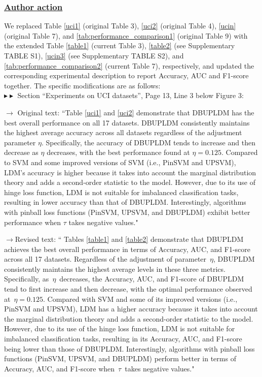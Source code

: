 \documentclass[journal,12pn, onecolumn]{IEEEtran}
\begin{document}
{{{{{\color{black}
\subsubsection*{\textbf{\underline{Author action }}}
We replaced Table \ref{uci1} (original Table 3), \ref{uci2} (original Table 4), \ref{ucin} (original Table 7), and \ref{tab:performance_comparison1} (original Table 9) with the extended Table \ref{table1} (current Table 3), \ref{table2} (see Supplementary TABLE S1), \ref{ucin3} (see Supplementary TABLE S2), and  \ref{tab:performance_comparison2} (current Table 7), respectively, and updated the corresponding experimental description to report Accuracy, AUC and F1-score together. The specific modifications are as follows: \\

$\blacktriangleright\blacktriangleright$ Section ``Experiments on UCI datasets'', Page 13,  Line 3 below Figure 3:\\
\par
{\color{black} $\longrightarrow$  Original  text: ``Table \ref{uci1} and \ref{uci2} demonstrate that DBUPLDM has the best overall performance on all 17 datasets. DBUPLDM consistently maintains the highest average accuracy across all datasets regardless of the adjustment parameter $\eta$. Specifically, the accuracy of DBUPLDM tends to increase and then decrease as $\eta$ decreases, with the best performance found at $\eta = 0.125$. Compared to SVM and some improved versions of SVM (i.e., PinSVM and UPSVM), LDM's accuracy is higher because it takes into account the marginal distribution theory and adds a second-order statistic to the model. However, due to its use of hinge loss function, LDM is not suitable for imbalanced classification tasks, resulting in lower accuracy than that of DBUPLDM. Interestingly, algorithms with pinball loss functions (PinSVM, UPSVM, and DBUPLDM) exhibit better performance when $\tau$ takes negative values."}\\
\par


{\color{orange}$\longrightarrow$Revised text: `` Tables \ref{table1} and \ref{table2} demonstrate that DBUPLDM achieves the best overall performance in terms of Accuracy, AUC, and F1-score across all 17 datasets. Regardless of the adjustment of parameter \(\eta\), DBUPLDM consistently maintains the highest average levels in these three metrics. Specifically, as \(\eta\) decreases, the Accuracy, AUC, and F1-score of DBUPLDM tend to first increase and then decrease, with the optimal performance observed at \(\eta = 0.125\). Compared with SVM and some of its improved versions (i.e., PinSVM and UPSVM), LDM has a higher accuracy because it takes into account the marginal distribution theory and adds a second-order statistic to the model. However, due to its use of the hinge loss function, LDM is not suitable for imbalanced classification tasks, resulting in its Accuracy, AUC, and F1-score being lower than those of DBUPLDM. Interestingly, algorithms with pinball loss functions (PinSVM, UPSVM, and DBUPLDM) perform better in terms of Accuracy, AUC, and F1-score when \(\tau\) takes negative values."}\\


}}}}}
\end{document}
